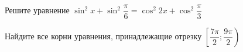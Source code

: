 \begin{ex}
	\begin{condition}
		\begin{enumcols}[label=\asbuk*)]
			\item Решите уравнение \( \sin^2 x + \sin^2 {\dfrac{\pi}{6}} = \cos^2 2x + \cos^2{\dfrac{\pi}{3}} \)
			\item Найдите все корни уравнения, принадлежащие отрезку \( \left[\dfrac{7\pi}{2};\dfrac{9\pi}{2}\right) \)
		\end{enumcols}
	\end{condition}
\end{ex}